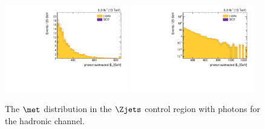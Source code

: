 \begin{figure}[htbp]
  \centering
  \includegraphics[width=0.48\textwidth]{figures/hadronic-incl-photon-fmet.pdf}
  \includegraphics[width=0.48\textwidth]{figures/hadronic-incl-photon-fmetlog.pdf}
  \caption{The $\met$ distribution in the $\Zjets$ control region with photons for the hadronic channel.}
  \label{fig:incl_hadronic_pho_fmet}
\end{figure}


